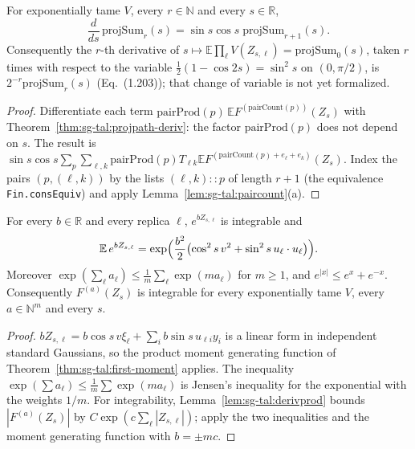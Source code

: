 \begin{theorem}
\label{thm:sg-tal:projsum-deriv}
  \leanok
{}
For exponentially tame $V$, every $r\in\mathbb N$ and every $s\in\mathbb R$,
\[
\frac{d}{ds}\,\mathrm{projSum}_r(s)=\sin s\cos s\;\mathrm{projSum}_{r+1}(s).
\]
Consequently the $r$-th derivative of $s\mapsto\mathbb E\prod_\ell V(Z_{s,\ell})=\mathrm{projSum}_0(s)$, taken $r$ times with respect to the variable
$\tfrac12(1-\cos 2s)=\sin^2s$ on $(0,\pi/2)$, is $2^{-r}\mathrm{projSum}_r(s)$ (Eq.~(1.203)); that change of variable is not yet formalized.
\end{theorem}
\begin{proof}
  \leanok
Differentiate each term $\mathrm{pairProd}(p)\,\mathbb E F^{(\mathrm{pairCount}(p))}(Z_s)$ with Theorem~\ref{thm:sg-tal:projpath-deriv}: the factor $\mathrm{pairProd}(p)$ does not depend on
$s$.  The result is $\sin s\cos s\sum_p\sum_{\ell,k}\mathrm{pairProd}(p)T_{\ell k}\mathbb E F^{(\mathrm{pairCount}(p)+e_\ell+e_k)}(Z_s)$.  Index the pairs $(p,(\ell,k))$ by the lists $(\ell,k)::p$ of length
$r+1$ (the equivalence \texttt{Fin.consEquiv}) and apply Lemma~\ref{lem:sg-tal:paircount}(a).
\end{proof}

\begin{lemma}
\label{lem:sg-tal:projpath-mgf}
  \leanok
{}
For every $b\in\mathbb R$ and every replica $\ell$, $e^{bZ_{s,\ell}}$ is integrable and
\[
\mathbb E\,e^{bZ_{s,\ell}}=\exp\Bigl(\frac{b^2}{2}\bigl(\cos^2s\,v^2+\sin^2s\,u_\ell\cdot u_\ell\bigr)\Bigr).
\]
Moreover $\exp(\sum_\ell a_\ell)\le\frac1m\sum_\ell\exp(ma_\ell)$ for $m\ge1$, and $e^{|x|}\le e^x+e^{-x}$.  Consequently $F^{(a)}(Z_s)$ is integrable for every
exponentially tame $V$, every $a\in\mathbb N^m$ and every $s$.
\end{lemma}
\begin{proof}
  \leanok
$bZ_{s,\ell}=b\cos s\,v\xi_\ell+\sum_i b\sin s\,u_{\ell i}y_i$ is a linear form in independent standard Gaussians, so the product moment generating function of
Theorem~\ref{thm:sg-tal:first-moment} applies.  The inequality $\exp(\sum a_\ell)\le\frac1m\sum\exp(ma_\ell)$ is Jensen's inequality for the exponential with
the weights $1/m$.  For integrability, Lemma~\ref{lem:sg-tal:derivprod} bounds $|F^{(a)}(Z_s)|$ by $C\exp(c\sum_\ell|Z_{s,\ell}|)$; apply the two inequalities and
the moment generating function with $b=\pm mc$.
\end{proof}

